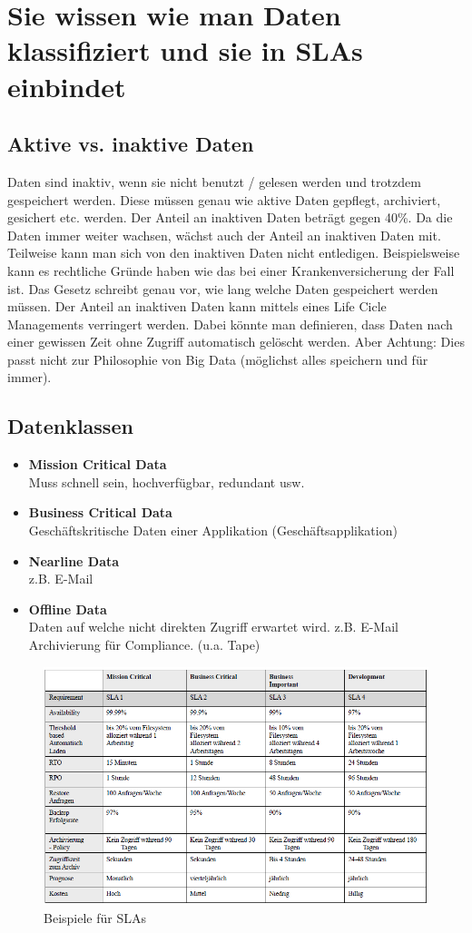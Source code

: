 \section{Sie wissen wie man Daten klassifiziert und sie in SLAs einbindet}
\subsection{Aktive vs. inaktive Daten}
Daten sind inaktiv, wenn sie nicht benutzt / gelesen werden und trotzdem gespeichert werden. Diese müssen genau wie aktive Daten gepflegt, archiviert, gesichert etc. werden.
Der Anteil an inaktiven Daten beträgt gegen 40\%. Da die Daten immer weiter wachsen, wächst auch der Anteil an inaktiven Daten mit. Teilweise kann man sich von den inaktiven Daten nicht entledigen. Beispielsweise kann es rechtliche Gründe haben wie das bei einer Krankenversicherung der Fall ist. Das Gesetz schreibt genau vor, wie lang welche Daten gespeichert werden müssen.
Der Anteil an inaktiven Daten kann mittels eines Life Cicle Managements verringert werden. Dabei könnte man definieren, dass Daten nach einer gewissen Zeit ohne Zugriff automatisch gelöscht werden. Aber Achtung: Dies passt nicht zur Philosophie von Big Data (möglichst alles speichern und für immer).

\subsection{Datenklassen}\label{sec:datenklassen}
\begin{itemize}
	\item \textbf{Mission Critical Data} \\
	Muss schnell sein, hochverfügbar, redundant usw.
	\item \textbf{Business Critical Data} \\
	Geschäftskritische Daten einer Applikation (Geschäftsapplikation)
	\item \textbf{Nearline Data} \\
	z.B. E-Mail
	\item \textbf{Offline Data} \\
	Daten auf welche nicht direkten Zugriff erwartet wird. z.B. E-Mail Archivierung für Compliance. (u.a. Tape)
\end{itemize}
\begin{figure}[h!]
	\centering
	\includegraphics[width=0.9\linewidth]{fig/sla}
	\caption{Beispiele für SLAs}
	\label{fig:sla_beispiele}
\end{figure}
